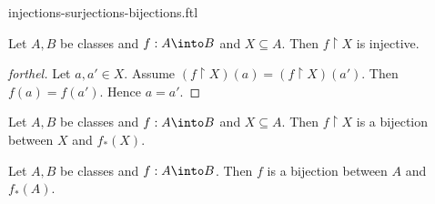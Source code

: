\documentclass{naproche-library}
\begin{document}
\begin{smodule}{injections-surjections-bijections.ftl}
  \begin{proposition}[forthel,id=FOUNDATIONS_08_2621531811217408,printid]
    Let $A, B$ be classes and $f : A \into B$ and $X \subseteq A$.
    Then $f \restriction X$ is injective.
  \end{proposition}
  \begin{proof}[forthel]
    Let $a, a' \in X$.
    Assume $(f \restriction X)(a) = (f \restriction X)(a')$.
    Then $f(a) = f(a')$.
    Hence $a = a'$.
  \end{proof}

  \begin{proposition}[forthel,id=FOUNDATIONS_08_647446231252992,printid]
    Let $A, B$ be classes and $f : A \into B$ and $X \subseteq A$.
    Then $f \restriction X$ is a bijection between $X$ and $f_{*}(X)$.
  \end{proposition}

  \begin{corollary}[forthel,id=FOUNDATIONS_08_8159443759923200,printid]
    Let $A, B$ be classes and $f : A \into B$.
    Then $f$ is a bijection between $A$ and $f_{*}(A)$.
  \end{corollary}
\end{smodule}
\end{document}
